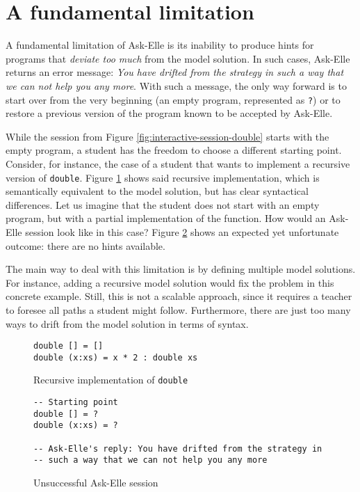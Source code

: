 \section{A fundamental limitation}
\label{sec:intro-fundamental-limitation}

A fundamental limitation of Ask-Elle is its inability to produce hints for programs that \emph{deviate too much} from the model solution. In such cases, Ask-Elle returns an error message: \emph{You have drifted from the strategy in such a way that we can not help you any more}. With such a message, the only way forward is to start over from the very beginning (an empty program, represented as \texttt{?}) or to restore a previous version of the program known to be accepted by Ask-Elle.

While the session from Figure \ref{fig:interactive-session-double} starts with the empty program, a student has the freedom to choose a different starting point. Consider, for instance, the case of a student that wants to implement a recursive version of \texttt{double}. Figure \ref{fig:limitations-recursive-double} shows said recursive implementation, which is semantically equivalent to the model solution, but has clear syntactical differences. Let us imagine that the student does not start with an empty program, but with a partial implementation of the function. How would an Ask-Elle session look like in this case? Figure \ref{fig:limitations-askelle-example-session} shows an expected yet unfortunate outcome: there are no hints available.

The main way to deal with this limitation is by defining multiple model solutions. For instance, adding a recursive model solution would fix the problem in this concrete example. Still, this is not a scalable approach, since it requires a teacher to foresee all paths a student might follow. Furthermore, there are just too many ways to drift from the model solution in terms of syntax.

\begin{figure}
\begin{verbatim}
double [] = []
double (x:xs) = x * 2 : double xs
\end{verbatim}
\caption{Recursive implementation of \texttt{double}}
\label{fig:limitations-recursive-double}
\end{figure}

\begin{figure}
\begin{verbatim}
-- Starting point
double [] = ?
double (x:xs) = ?

-- Ask-Elle's reply: You have drifted from the strategy in
-- such a way that we can not help you any more
\end{verbatim}
\caption{Unsuccessful Ask-Elle session}
\label{fig:limitations-askelle-example-session}
\end{figure}

